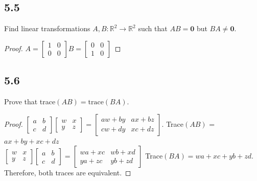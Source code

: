 \documentclass{amsart}
\begin{document}
\subsection*{5.5} Find linear transformations $A, B : \mathbb{R}^2 \to \mathbb{R}^2$ such that $AB = \mathbf{0}$ but $BA \neq \mathbf{0}$.

\begin{proof}$
 A =   \begin{bmatrix}
        1 & 0 \\ 0 & 0 
    \end{bmatrix}
    B = \begin{bmatrix}
        0 & 0 \\ 1 & 0
    \end{bmatrix}
$
\end{proof}

\subsection*{5.6} Prove that trace$(AB) = \text{trace}(BA)$.
\begin{proof}
    $\begin{bmatrix} a & b \\ c & d \end{bmatrix} \begin{bmatrix} w & x \\ y & z \end{bmatrix} = \begin{bmatrix} aw + by & ax + bz \\ cw+dy & xc + dz \end{bmatrix}$. Trace$(AB)$ = $ax+by+xc+dz$ \\
    $\begin{bmatrix}
        w &x \\ y & z 
    \end{bmatrix} \begin{bmatrix}
        a & b \\ c & d
    \end{bmatrix} = \begin{bmatrix}
        wa + xc & wb + xd \\ ya + zc & yb + zd
    \end{bmatrix}$ Trace$(BA) = wa + xc + yb + zd$. \\
    Therefore, both traces are equivalent.
\end{proof}
\end{document}
